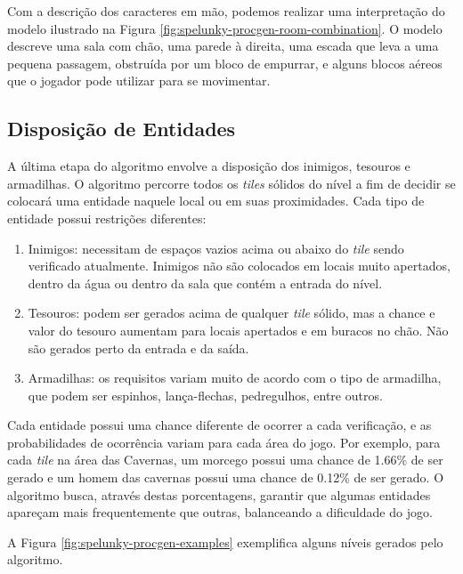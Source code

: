 Com a descrição dos caracteres em mão, podemos realizar uma interpretação do
modelo ilustrado na Figura \ref{fig:spelunky-procgen-room-combination}. O modelo
descreve uma sala com chão, uma parede à direita, uma escada que leva a uma
pequena passagem, obstruída por um bloco de empurrar, e alguns blocos aéreos que
o jogador pode utilizar para se movimentar.

\subsection{\label{section:spelunky-procgen-entities}Disposição de Entidades}
A última etapa do algoritmo envolve a disposição dos inimigos, tesouros e
armadilhas. O algoritmo percorre todos os \textit{tiles} sólidos do nível a fim
de decidir se colocará uma entidade naquele local ou em suas proximidades.  Cada
tipo de entidade possui restrições diferentes:

\begin{enumerate}
	\item Inimigos: necessitam de espaços vazios acima ou abaixo do
	\textit{tile} sendo verificado atualmente. Inimigos não são colocados em
	locais muito apertados, dentro da água ou dentro da sala que contém a
	entrada do nível.

	\item Tesouros: podem ser gerados acima de qualquer \textit{tile} sólido,
	mas a chance e valor do tesouro aumentam para locais apertados e em buracos
	no chão. Não são gerados perto da entrada e da saída.

	\item Armadilhas: os requisitos variam muito de acordo com o tipo de
	armadilha, que podem ser espinhos, lança-flechas, pedregulhos, entre outros.
\end{enumerate}

Cada entidade possui uma chance diferente de ocorrer a cada verificação, e as
probabilidades de ocorrência variam para cada área do jogo. Por exemplo, para
cada \textit{tile} na área das Cavernas, um morcego possui uma chance de 1.66\%
de ser gerado e um homem das cavernas possui uma chance de 0.12\% de ser gerado.
O algoritmo busca, através destas porcentagens, garantir que algumas entidades
apareçam mais frequentemente que outras, balanceando a dificuldade do jogo.

A Figura \ref{fig:spelunky-procgen-examples} exemplifica alguns níveis gerados
pelo algoritmo.

